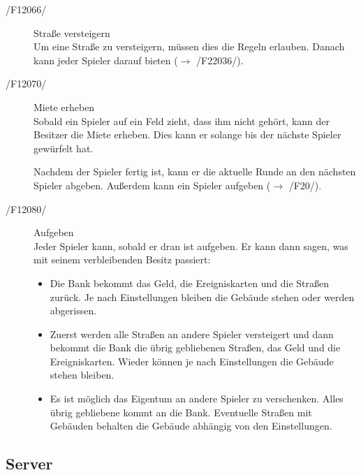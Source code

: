 \documentclass[a4paper,10pt]{article}
\begin{document}
\begin{description}
\item[/F12066/] Straße versteigern \\
Um eine Straße zu versteigern, müssen dies die Regeln erlauben. Danach kann jeder Spieler darauf bieten ($\rightarrow$ /F22036/).
\item[/F12070/] Miete erheben \\
Sobald ein Spieler auf ein Feld zieht, dass ihm nicht gehört, kann der Besitzer die Miete erheben. Dies kann er solange bis der nächste Spieler gewürfelt hat.

Nachdem der Spieler fertig ist, kann er die aktuelle Runde an den nächsten Spieler abgeben. Außerdem kann ein Spieler aufgeben ($\rightarrow$ /F20/).
\item[/F12080/] Aufgeben \\
Jeder Spieler kann, sobald er dran ist aufgeben. Er kann dann sagen, was mit seinem verbleibenden Besitz passiert:
\begin{itemize}
\item Die Bank bekommt das Geld, die Ereigniskarten und die Straßen zurück. Je nach Einstellungen bleiben die Gebäude stehen oder werden abgerissen.
\item Zuerst werden alle Straßen an andere Spieler versteigert und dann bekommt die Bank die übrig gebliebenen Straßen, das Geld und die Ereigniskarten. Wieder können je nach Einstellungen die Gebäude stehen bleiben.
\item Es ist möglich das Eigentum an andere Spieler zu verschenken. Alles übrig gebliebene kommt an die Bank. Eventuelle Straßen mit Gebäuden behalten die Gebäude abhängig von den Einstellungen.
\end{itemize}
\end{description}

\subsection{Server}
\end{document}
